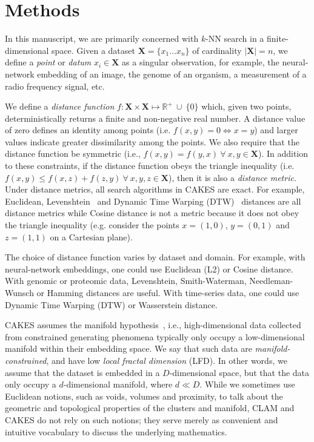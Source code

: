 \section{Methods}
\label{sec:methods}

In this manuscript, we are primarily concerned with $k$-NN search in a finite-dimensional space.
Given a dataset $\textbf{X} = \{x_1 \dots x_n\}$ of cardinality $|\textbf{X}| = n$, we define a \emph{point} or \emph{datum} $x_i \in \textbf{X}$ as a singular observation, for example, the neural-network embedding of an image, the genome of an organism, a measurement of a radio frequency signal, etc.

We define a \emph{distance function} $f : \textbf{X} \times \textbf{X} \mapsto \mathbb{R}^+ \ \cup \ \{0\}$ which, given two points, deterministically returns a finite and non-negative real number.
A distance value of zero defines an identity among points (i.e. $f(x, y) = 0 \Leftrightarrow x = y$) and larger values indicate greater dissimilarity among the points.
We also require that the distance function be symmetric (i.e., $f(x, y) = f(y, x) \ \forall \ x, y \in \textbf{X}$).
In addition to these constraints, if the distance function obeys the triangle inequality (i.e. $f(x, y) \leq f(x, z) + f(z, y) \ \forall \ x, y, z \in \textbf{X}$), then it is also a \emph{distance metric}.
Under distance metrics, all search algorithms in CAKES are exact.
For example, Euclidean, Levenshtein~\cite{levenshtein1966binary} and Dynamic Time Warping (DTW)~\cite{muller2007dynamic} distances are all distance metrics while Cosine distance is not a metric because it does not obey the triangle inequality (e.g. consider the points $x = (1, 0)$, $y = (0, 1)$ and $z = (1, 1)$ on a Cartesian plane).

The choice of distance function varies by dataset and domain.
For example, with neural-network embeddings, one could use Euclidean (L2) or Cosine distance.
With genomic or proteomic data, Levenshtein, Smith-Waterman, Needleman-Wunsch or Hamming distances are useful.
With time-series data, one could use Dynamic Time Warping (DTW) or Wasserstein distance.

CAKES assumes the manifold hypothesis~\cite{fefferman2016testing}, i.e., high-dimensional data collected from constrained generating phenomena typically only occupy a low-dimensional manifold within their embedding space.
We say that such data are \emph{manifold-constrained}, and have low \emph{local fractal dimension} (LFD).
In other words, we assume that the dataset is embedded in a $D$-dimensional space, but that the data only occupy a $d$-dimensional manifold, where $d \ll D$.
While we sometimes use Euclidean notions, such as voids, volumes and proximity, to talk about the geometric and topological properties of the clusters and manifold, CLAM and CAKES do not rely on such notions;
they serve merely as convenient and intuitive vocabulary to discuss the underlying mathematics.


